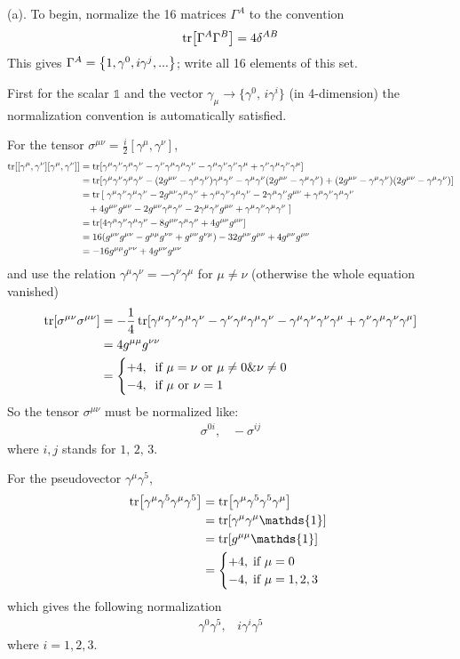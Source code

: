 \documentclass{article}
\newcommand{\gm}{\gamma^{\mu}}
\newcommand{\gn}{\gamma^{\nu}}
\newcommand{\gmn}{g^{\mu\nu}}
\newcommand{\gnm}{g^{\nu\mu}}
\newcommand{\gmm}{g^{\mu\mu}}
\newcommand{\gnn}{g^{\nu\nu}}
\begin{document}
(a). To begin, normalize the 16 matrices $\Gamma^A$ to the convention
\begin{align}
  \tr[\Gamma^A\Gamma^B]=4\delta^{AB}
\end{align}
This gives $\Gamma^A=\Bqty{1,\gamma^0,i\gamma^j,...}$; write all 16 elements of this set.

First for the scalar $\mathds{1}$ and the vector $\gamma_{\mu}\rightarrow\{\gamma^0,\,i\gamma^i\}$ (in 4-dimension) the normalization convention is automatically satisfied.

For the tensor $\sigma^{\mu\nu}=\frac{i}{2}[\gamma^{\mu},\gamma^{\nu}]$,
\begin{align*}
  \tr[[\gamma^{\mu},\gamma^{\nu}][\gamma^{\mu},\gamma^{\nu}]]&=\tr[\gm\gn\gm\gn-\gn\gm\gm\gn-\gm\gn\gn\gm+\gn\gm\gn\gm]\\
  &=\tr[\gm\gn\gm\gn-(2\gmn-\gm\gn)\gm\gn-\gm\gn(2\gmn-\gm\gn)+(2\gmn-\gm\gn)(2\gmn-\gm\gn)]\\
  &=\tr\left[\right.\gm\gn\gm\gn-2\gmn\gm\gn+\gm\gn\gm\gn-2\gm\gn\gmn+\gm\gn\gm\gn\\
  &\;\;\;+4\gmn\gmn-2\gmn\gm\gn-2\gm\gn\gmn+\gm\gn\gm\gn\left.\right]\\
  &=\tr[4\gm\gn\gm\gn-8\gmn\gm\gn+4\gmn\gmn]\\
  &=16(\gmn\gmn-\gmm\gnn+\gmn\gnm)-32\gmn\gmn+4\gmn\gmn\\
  &=-16\gmm\gnn+4\gmn\gmn
\end{align*}
and use the relation $\gm\gn=-\gn\gm$ for $\mu\neq\nu$ (otherwise the whole equation vanished)
\begin{align*}
  \tr[\sigma^{\mu\nu}\sigma^{\mu\nu}]&=-\frac{1}{4}\tr[\gm\gn\gm\gn-\gn\gm\gm\gn-\gm\gn\gn\gm+\gn\gm\gn\gm]\\
  &=4\gmm\gnn\\
  &=\begin{cases}
  +4,\;\;\text{if $\mu=\nu$ or $\mu\neq0\&\nu\neq0$}\\
  -4,\;\;\text{if $\mu\text{ or }\nu=1$}
  \end{cases}
\end{align*}
So the tensor $\sigma^{\mu\nu}$ must be normalized like:
\begin{align*}
  \sigma^{0i},\;\;\;-\sigma^{ij}
\end{align*}
where $i,j$ stands for $1,\,2,\,3$.

For the pseudovector $\gamma^{\mu}\gamma^5$,
\begin{align*}
  \tr[\gm\gamma^5\gm\gamma^5]&=\tr[\gm\gamma^5\gamma^5\gm]\\
  &=\tr[\gm\gm \mathds{1}]\\
  &=\tr[\gmm \mathds{1}]\\
  &=\begin{cases}
  +4,\;\text{if $\mu=0$}\\
  -4,\;\text{if $\mu=1,2,3$}
  \end{cases}
\end{align*}
which gives the following normalization
\begin{align*}
  \gamma^0\gamma^5,\;\;\;i\gamma^i\gamma^5
\end{align*}
where $i=1,2,3$.
\end{document}
